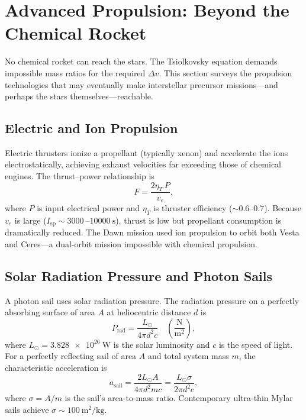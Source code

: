 \documentclass[12pt,a4paper]{article}
\begin{document}
\section[Advanced Propulsion: Beyond the Chemical Rocket]{Advanced Propulsion: Beyond the\\Chemical Rocket}

No chemical rocket can reach the stars. The Tsiolkovsky equation demands
impossible mass ratios for the required $\Delta v$. This section surveys the
propulsion technologies that may eventually make interstellar precursor
missions---and perhaps the stars themselves---reachable.

\subsection{Electric and Ion Propulsion}

Electric thrusters ionize a propellant (typically xenon) and accelerate the
ions electrostatically, achieving exhaust velocities far exceeding those of
chemical engines. The thrust--power relationship is
\begin{equation}
  F = \frac{2\eta_T\,P}{v_e},
  \label{eq:ion_thrust}
\end{equation}
where $P$ is input electrical power and $\eta_T$ is thruster efficiency
($\sim 0.6$--$0.7$). Because $v_e$ is large ($I_{\mathrm{sp}} \sim
\SI{3000}{}$--$\SI{10000}{\second}$), thrust is low but propellant
consumption is dramatically reduced. The Dawn mission used ion propulsion
to orbit both Vesta and Ceres---a dual-orbit mission impossible with chemical
propulsion.

\subsection{Solar Radiation Pressure and Photon Sails}

A photon sail uses solar radiation pressure. The radiation pressure on a
perfectly absorbing surface of area $A$ at heliocentric distance $d$ is
\begin{equation}
  P_\mathrm{rad} = \frac{L_\odot}{4\pi d^2 c}\quad \left(\frac{\text{N}}{\text{m}^2}\right),
  \label{eq:rad_press}
\end{equation}
where $L_\odot = \SI{3.828e26}{\watt}$ is the solar luminosity and $c$ is the
speed of light. For a perfectly reflecting sail of area $A$ and total system
mass $m$, the characteristic acceleration is
\begin{equation}
  a_{\mathrm{sail}} = \frac{2 L_\odot A}{4\pi d^2 m c}
    = \frac{L_\odot \sigma}{2\pi d^2 c},
  \label{eq:sail_acc}
\end{equation}
where $\sigma = A/m$ is the sail's area-to-mass ratio. Contemporary
ultra-thin Mylar sails achieve $\sigma \sim \SI{100}{\meter\squared\per\kilo\gram}$.
\end{document}
